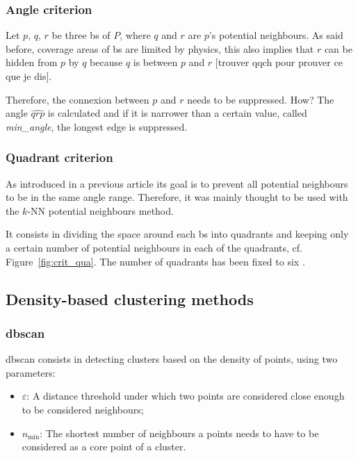 \documentclass[lettersize,journal,english]{IEEEtran}
\begin{document}
        \subsubsection{Angle criterion}
            Let $p$, $q$, $r$ be three \acrshort{bs} of $P$, where $q$ and $r$ are $p$'s potential neighbours. As said before, coverage areas of \acrshort{bs} are limited by physics, this also implies that $r$ can be \og hidden\fg{} from $p$ by $q$ because $q$ is between $p$ and $r$ [trouver qqch pour prouver ce que je dis].

            Therefore, the connexion between $p$ and $r$ needs to be suppressed. How? The angle $\widehat{qrp}$ is calculated and if it is narrower than a certain value, called \emph{min\_angle}, the longest edge is suppressed.

        \subsubsection{Quadrant criterion}
            As introduced in a previous article \cite{10201211} its goal is to prevent all potential neighbours to be in the same angle range. Therefore, it was mainly thought to be used with the $k$-NN potential neighbours method.

            It consists in dividing the space around each \acrshort{bs} into quadrants and keeping only a certain number of potential neighbours in each of the quadrants, cf. Figure~\ref{fig:crit_qua}.
            The number of quadrants has been fixed to six \cite{art_del_paq}.

    \subsection{Density-based clustering methods}
        \subsubsection{\acrshort{dbscan}}
            \acrshort{dbscan} consists in detecting clusters based on the density of points, using two parameters:
            \begin{itemize}
                \item $\varepsilon$: A distance threshold under which two points are considered close enough to be considered neighbours;   
                \item $n_{\text{min}}$: The shortest number of neighbours a points needs to have to be considered as a core point of a cluster.
            \end{itemize}
\end{document}
